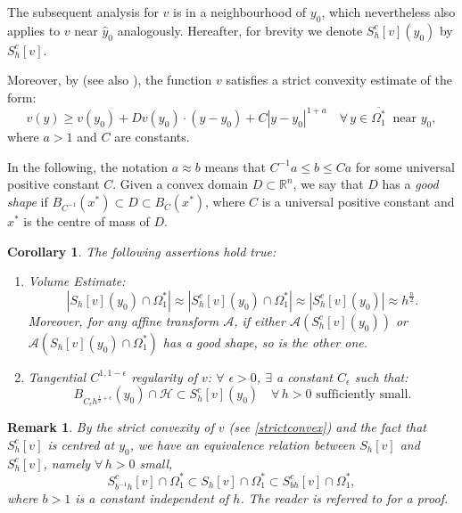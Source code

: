 \documentclass[10pt,a4paper]{amsart}
\theoremstyle{plain}
\newtheorem{corollary}{Corollary}[section]
\newtheorem{remark}{Remark}[section]
\newcommand{\0}{\textbf{0}}
\numberwithin{equation}{section}
\numberwithin{equation}{section}
\numberwithin{figure}{section}
\begin{document}
The subsequent analysis for $v$ is in a neighbourhood of $y_0$, which nevertheless also applies to $v$ near $\hat y_0$ analogously. 
Hereafter, for brevity we
denote $S^c_{h}[v](y_0)$ by  $S^c_{h}[v]$. 

Moreover, by \cite[Corollary 2.3]{C96} (see also \cite[Proof of Theorem 1]{C92b}), the function $v$ satisfies a strict convexity estimate of the form:
\begin{equation}\label{strictconvex}
v(y) \geq v(y_0) + Dv(y_0) \cdot (y - y_0) + C |y - y_0|^{1 + a}  \quad \forall\, y \in \overline{\Omega_1^*} \ \text{ near } y_0,
\end{equation}
where $a > 1$ and $C$ are constants.

In the following, the notation $a \approx b$ means that $C^{-1}a \leq b \leq Ca$ for some universal positive constant $C.$  Given a convex domain $D \subset \mathbb{R}^n$, we say that $D$ has a \emph{good shape} if $B_{C^{-1}}(x^*) \subset D \subset B_{C}(x^*)$, where $C$ is a universal positive constant and $x^*$ is the centre of mass of $D$.

\begin{corollary}\label{co21}
The following assertions hold true:
\begin{enumerate}
\item[(i)] \emph{Volume Estimate:}
\begin{equation}\label{vol}
|S_h[v](y_0)\cap \Omega_1^*| \approx |S_h^c[v](y_0)\cap \Omega_1^*| \approx |S_h^c[v](y_0)| \approx h^{\frac{n}{2}}.
\end{equation}
Moreover, for any affine transform $\mathcal{A}$, 
if either $\mathcal{A}(S_h^c[v](y_0))$ or $\mathcal{A}(S_h[v](y_0) \cap \Omega_1^*)$ has a good shape, so is the other one.

\item[(ii)] \emph{Tangential $C^{1,1-\epsilon}$ regularity of $v$:} $\forall$ $\epsilon > 0$, $\exists$ a constant $C_\epsilon$ such that:
\begin{equation}\label{tanc2}
B_{C_\epsilon h^{\frac{1}{2}+\epsilon}}(y_0) \cap \mathcal{H} \subset S_h^c[v](y_0) \quad \forall\, h > 0\text{ sufficiently small}.
\end{equation}
\end{enumerate}
\end{corollary}

\begin{remark}\label{reeq1}
\emph{ By the strict convexity of $v$ (see \eqref{strictconvex}) and the fact that $S^c_h[v]$ is centred at $y_0$,
we have an equivalence relation between $S_h[v]$ and $S^c_{h}[v]$, namely $\forall\,h>0$ small, 
\begin{equation}\label{equi0}
S^c_{b^{-1}h}[v] \cap \Omega_1^*\subset S_h[v] \cap \Omega_1^* \subset S^c_{bh}[v] \cap \Omega_1^*,
\end{equation}
where \( b>1 \) is a constant independent of \( h \). 
The reader is referred to \cite[Lemma 2.2]{CLW1} for a proof. }
\end{remark}
\end{document}
